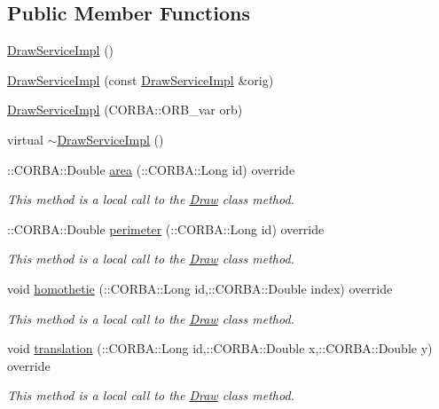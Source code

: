 \subsection*{Public Member Functions}
\begin{DoxyCompactItemize}
\item 
\hyperlink{class_draw_service_impl_a87d912a8f00ffa723cb8f53431f5266b}{Draw\+Service\+Impl} ()
\item 
\hyperlink{class_draw_service_impl_aba8a8c89630f768c86934aa551bd7632}{Draw\+Service\+Impl} (const \hyperlink{class_draw_service_impl}{Draw\+Service\+Impl} \&orig)
\item 
\hyperlink{class_draw_service_impl_a91a0c11ba71dac862ba24a1152046ef9}{Draw\+Service\+Impl} (C\+O\+R\+B\+A\+::\+O\+R\+B\+\_\+var orb)
\item 
virtual \hyperlink{class_draw_service_impl_a0ed99cbf8486cbbab8061728d005dd8a}{$\sim$\+Draw\+Service\+Impl} ()
\item 
\+::C\+O\+R\+B\+A\+::\+Double \hyperlink{class_draw_service_impl_af7c453d679b203736a8b46ccbf011205}{area} (\+::C\+O\+R\+B\+A\+::\+Long id) override
\begin{DoxyCompactList}\small\item\em This method is a local call to the \hyperlink{class_draw}{Draw} class method. \end{DoxyCompactList}\item 
\+::C\+O\+R\+B\+A\+::\+Double \hyperlink{class_draw_service_impl_a48036a5f8d3cea2fcd81bf1c36581d3b}{perimeter} (\+::C\+O\+R\+B\+A\+::\+Long id) override
\begin{DoxyCompactList}\small\item\em This method is a local call to the \hyperlink{class_draw}{Draw} class method. \end{DoxyCompactList}\item 
void \hyperlink{class_draw_service_impl_a2ded991472f1d2e1afab3a475360e070}{homothetie} (\+::C\+O\+R\+B\+A\+::\+Long id,\+::C\+O\+R\+B\+A\+::\+Double index) override
\begin{DoxyCompactList}\small\item\em This method is a local call to the \hyperlink{class_draw}{Draw} class method. \end{DoxyCompactList}\item 
void \hyperlink{class_draw_service_impl_a0b11a8d94d84c97a00de63873370e932}{translation} (\+::C\+O\+R\+B\+A\+::\+Long id,\+::C\+O\+R\+B\+A\+::\+Double x,\+::C\+O\+R\+B\+A\+::\+Double y) override
\begin{DoxyCompactList}\small\item\em This method is a local call to the \hyperlink{class_draw}{Draw} class method. \end{DoxyCompactList}\item 

\end{DoxyCompactItemize}
